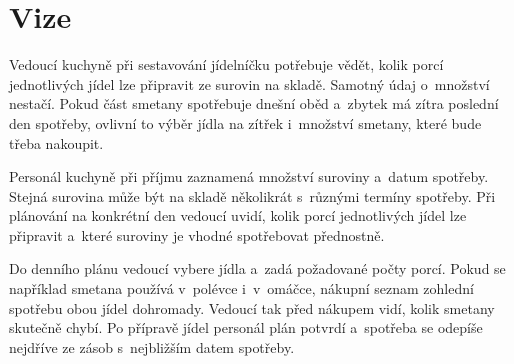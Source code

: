 \chapter{Vize}

Vedoucí kuchyně při sestavování jídelníčku potřebuje vědět, kolik porcí
jednotlivých jídel lze připravit ze surovin na skladě. Samotný údaj
o~množství nestačí. Pokud část smetany spotřebuje dnešní oběd a~zbytek
má zítra poslední den spotřeby, ovlivní to výběr jídla na zítřek
i~množství smetany, které bude třeba nakoupit.

Personál kuchyně při příjmu zaznamená množství suroviny a~datum
spotřeby. Stejná surovina může být na skladě několikrát s~různými
termíny spotřeby. Při plánování na konkrétní den vedoucí uvidí, kolik
porcí jednotlivých jídel lze připravit a~které suroviny je vhodné
spotřebovat přednostně.

Do denního plánu vedoucí vybere jídla a~zadá požadované počty porcí.
Pokud se například smetana používá v~polévce i~v~omáčce, nákupní
seznam zohlední spotřebu obou jídel dohromady. Vedoucí tak před nákupem
vidí, kolik smetany skutečně chybí. Po přípravě jídel personál plán
potvrdí a~spotřeba se odepíše nejdříve ze zásob s~nejbližším datem
spotřeby.
